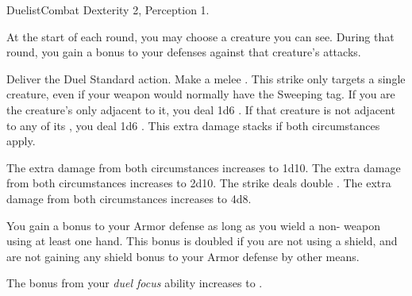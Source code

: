   \begin{feat}{Duelist}{Combat}
    \featpre Dexterity 2, Perception 1.

     At the start of each round, you may choose a creature you can see.
    During that round, you gain a  bonus to your defenses against that creature's attacks.

    \begin{activeability}{Deliver the Duel}
      \abilityusagetime Standard action.
      \rankline
      Make a melee .
      This strike only targets a single creature, even if your weapon would normally have the Sweeping tag.
      If you are the creature's only  adjacent to it, you deal 1d6 .
      If that creature is not adjacent to any of its , you deal 1d6 .
      This extra damage stacks if both circumstances apply.

      \rankline
       The extra damage from both circumstances increases to 1d10.
       The extra damage from both circumstances increases to 2d10.
       The strike deals double .
       The extra damage from both circumstances increases to 4d8.
    \end{activeability}

     You gain a  bonus to your Armor defense as long as you wield a non- weapon using at least one hand.
    This bonus is doubled if you are not using a shield, and are not gaining any shield bonus to your Armor defense by other means.

     The bonus from your \textit{duel focus} ability increases to .
  \end{feat}

